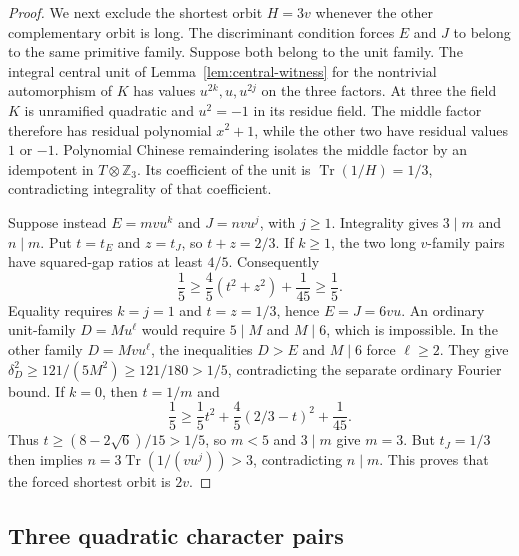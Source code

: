 \documentclass[11pt,reqno]{amsart}
\theoremstyle{remark}\newtheorem{remark}[theorem]{Remark}
\numberwithin{equation}{section}
\begin{document}
\begin{proof}
We next exclude the shortest orbit $H=3v$ whenever the other
complementary orbit is long. The discriminant condition forces
$E$ and $J$ to belong to the same primitive family.
Suppose both belong to the unit family. The integral central unit
of Lemma~\ref{lem:central-witness} for the nontrivial automorphism of $K$
has values $u^{2k},u,u^{2j}$ on the three factors.
At three the field $K$ is unramified quadratic and $u^2=-1$ in
its residue field. The middle factor therefore has residual
polynomial $x^2+1$, while the other two have residual values
$1$ or $-1$. Polynomial Chinese remaindering isolates the middle
factor by an idempotent in $T\otimes\mathbb Z_3$.
Its coefficient of the unit is $\operatorname{Tr}(1/H)=1/3$,
contradicting integrality of that coefficient.

Suppose instead $E=mvu^k$ and $J=nvu^j$, with $j\ge1$.
Integrality gives $3\mid m$ and $n\mid m$.
Put $t=t_E$ and $z=t_J$, so $t+z=2/3$.
If $k\ge1$, the two long $v$-family pairs have squared-gap
ratios at least $4/5$. Consequently
\[
 \frac15\ge\frac45(t^2+z^2)+\frac1{45}\ge\frac15.
\]
Equality requires $k=j=1$ and $t=z=1/3$, hence
$E=J=6vu$. An ordinary unit-family $D=Mu^\ell$ would require
$5\mid M$ and $M\mid6$, which is impossible. In the other
family $D=Mvu^\ell$, the inequalities $D>E$ and $M\mid6$
force $\ell\ge2$. They give
$\delta_D^2\ge121/(5M^2)\ge121/180>1/5$, contradicting the
separate ordinary Fourier bound.
If $k=0$, then $t=1/m$ and
\[
 \frac15\ge\frac15t^2+\frac45(2/3-t)^2+\frac1{45}.
\]
Thus $t\ge(8-2\sqrt6)/15>1/5$, so $m<5$ and $3\mid m$
give $m=3$. But $t_J=1/3$ then implies
$n=3\operatorname{Tr}(1/(vu^j))>3$, contradicting $n\mid m$.
This proves that the forced shortest orbit is $2v$.
\end{proof}
\subsection{Three quadratic character pairs}
\end{document}
